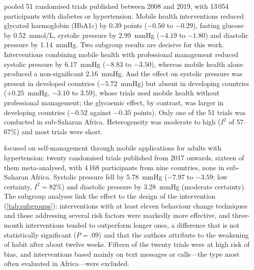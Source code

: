 \documentclass[11pt,a4paper,oneside]{report}
\begin{document}
\Textcite{mao2020} pooled 51 randomised trials published between 2008 and 2019, with 13\,054 participants with diabetes or hypertension. Mobile health interventions reduced glycated haemoglobin (HbA1c) by 0.39 points ($-0.50$ to $-0.29$), fasting glucose by 0.52~mmol/L, systolic pressure by 2.99~mmHg ($-4.19$ to $-1.80$) and diastolic pressure by 1.14~mmHg. Two subgroup results are decisive for this work. Interventions combining mobile health with professional management reduced systolic pressure by 6.17~mmHg ($-8.83$ to $-3.50$), whereas mobile health alone produced a non-significant 2.16~mmHg. And the effect on systolic pressure was present in developed countries ($-5.72$~mmHg) but absent in developing countries ($+0.25$~mmHg, $-3.10$ to $3.59$), whose trials used mobile health without professional management; the glycaemic effect, by contrast, was larger in developing countries ($-0.52$ against $-0.35$ points). Only one of the 51 trials was conducted in sub-Saharan Africa. Heterogeneity was moderate to high ($I^2$ of 57--67\%) and most trials were short.

\Textcite{zhou2024} focused on self-management through mobile applications for adults with hypertension: twenty randomised trials published from 2017 onwards, sixteen of them meta-analysed, with 4\,168 participants from nine countries, none in sub-Saharan Africa. Systolic pressure fell by 5.78~mmHg ($-7.97$ to $-3.59$; low certainty, $I^2 = 82\%$) and diastolic pressure by 3.28~mmHg (moderate certainty). The subgroup analyses link the effect to the design of the intervention (\cref{tab:subgroups}): interventions with at least eleven behaviour change techniques and those addressing several risk factors were markedly more effective, and three-month interventions tended to outperform longer ones, a difference that is not statistically significant ($P = .09$) and that the authors attribute to the weakening of habit after about twelve weeks. Fifteen of the twenty trials were at high risk of bias, and interventions based mainly on text messages or calls---the type most often evaluated in Africa---were excluded.
\end{document}
